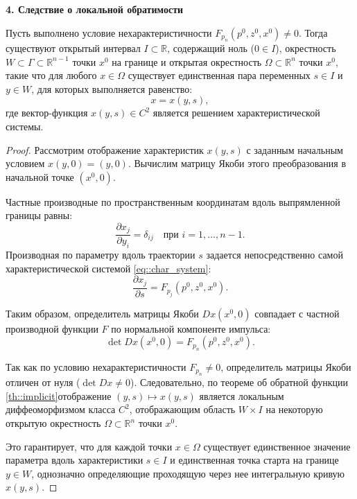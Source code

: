 \textbf{4. Следствие о локальной обратимости}
\begin{corollary}
Пусть выполнено условие нехарактеристичности $F_{p_n}(p^0, z^0, x^0) \neq 0$. 
Тогда существуют открытый интервал $I \subset \mathbb{R}$, содержащий ноль 
($0 \in I$), окрестность $W \subset \Gamma \subset \mathbb{R}^{n-1}$ точки 
$x^0$ на границе и открытая окрестность $\Omega \subset \mathbb{R}^n$ точки
$x^0$, такие что для любого $x \in \Omega$ существует единственная пара
переменных $s \in I$ и $y \in W$, для которых выполняется равенство:
\begin{equation}
    x = x(y, s),
\end{equation}
где вектор-функция $x(y, s) \in C^2$ является решением характеристической системы.
\end{corollary}

\begin{proof}
Рассмотрим отображение характеристик $x(y, s)$ с заданным начальным условием
$x(y, 0) = (y, 0)$. Вычислим матрицу Якоби этого преобразования в начальной
точке $(x^0, 0)$.

Частные производные по пространственным координатам вдоль выпрямленной
границы равны:
\begin{equation}
    \frac{\partial x_j}{\partial y_i} = \delta_{ij} \quad \text{при } i = 1, \dots, n-1.
\end{equation}
Производная по параметру вдоль траектории $s$ задается непосредственно самой
характеристической системой \eqref{eq::char_system}:
\begin{equation}
    \frac{\partial x_j}{\partial s} = F_{p_j}(p^0, z^0, x^0).
\end{equation}

Таким образом, определитель матрицы Якоби $D x(x^0, 0)$ совпадает с частной
производной функции $F$ по нормальной компоненте импульса:
\begin{equation}
    \det D x(x^0, 0) = F_{p_n}(p^0, z^0, x^0).
\end{equation}

Так как по условию нехарактеристичности $F_{p_n} \neq 0$, определитель матрицы
Якоби отличен от нуля ($\det D x \neq 0$). Следовательно, по теореме об
обратной функции \eqref{th::implicit}отображение $(y, s) \mapsto x(y, s)$ является локальным диффеоморфизмом класса $C^2$, отображающим область $W \times I$ на некоторую открытую окрестность $\Omega \subset \mathbb{R}^n$ точки $x^0$. 

Это гарантирует, что для каждой точки $x \in \Omega$ существует единственное значение параметра вдоль характеристики $s \in I$ и единственная точка старта на границе $y \in W$, однозначно определяющие проходящую через нее интегральную кривую $x(y,s)$.

\end{proof}

